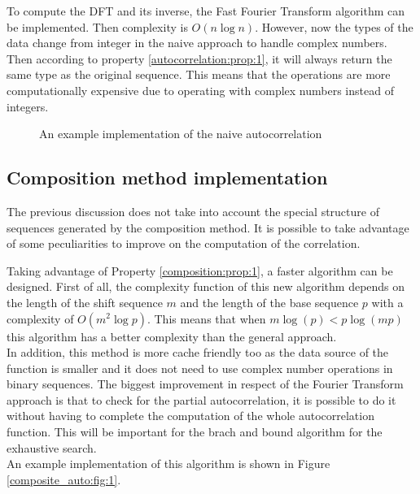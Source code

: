         To compute the DFT and its inverse, the Fast Fourier
        Transform\cite{fast_fourier_transform} algorithm can be implemented. Then complexity is $O(n \log n)$.  However, now the types of the data change from integer in the naive approach to handle complex numbers. Then according to  property \ref{autocorrelation:prop:1}, it will always return the same type as the original sequence. This means that the operations are more computationally expensive due to operating with complex numbers instead of integers.
          \begin{figure}
            \caption{An example implementation of the naive autocorrelation}
            \label{naive_auto:fig:1}
          \end{figure}

      \subsection{Composition method implementation}

      The previous discussion does not take into account the special structure of sequences generated by the composition method. It is possible to take advantage of some peculiarities to improve on the computation of the correlation.

     Taking advantage of Property \ref{composition:prop:1}, a faster algorithm can be designed. First of all, the complexity function of this new algorithm depends on the length of the shift sequence $m$  and the length of the base sequence $p$ with a complexity of $O(m^2 \log p)$. This means
      that when $m\log(p) < p\log(mp)$ this algorithm has a better complexity than the general approach.\\

      In addition, this method is more cache friendly too as the data source of the function is smaller and it
      does not need to use complex number operations in binary sequences. The biggest improvement in respect of the Fourier Transform approach is that to check for the partial autocorrelation, it is possible to do it without having to complete the computation of the whole autocorrelation function. This will be important for the brach and bound algorithm for the exhaustive search.\\

      An example implementation of this algorithm is shown in Figure
      \ref{composite_auto:fig:1}.

